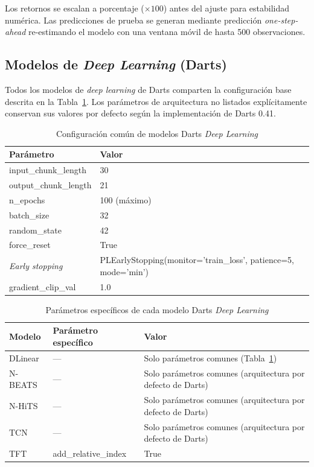 Los retornos se escalan a porcentaje ($\times 100$) antes del ajuste para estabilidad num\'erica. Las predicciones de prueba se generan mediante predicci\'on \textit{one-step-ahead} re-estimando el modelo con una ventana m\'ovil de hasta 500 observaciones.

\subsection{Modelos de \textit{Deep Learning} (Darts)}
\label{app:dl_hyperparams}

Todos los modelos de \textit{deep learning} de Darts comparten la configuraci\'on base descrita en la Tabla~\ref{tab:darts_dl_common}. Los par\'ametros de arquitectura no listados expl\'icitamente conservan sus valores por defecto seg\'un la implementaci\'on de Darts 0.41.

\begin{table}[H]
\centering
\caption{Configuraci\'on com\'un de modelos Darts \textit{Deep Learning}}
\label{tab:darts_dl_common}
\small
\begin{tabular}{@{}lp{10cm}@{}}
\toprule
\textbf{Par\'ametro} & \textbf{Valor} \\
\midrule
input\_chunk\_length & 30 \\
output\_chunk\_length & 21 \\
n\_epochs & 100 (m\'aximo) \\
batch\_size & 32 \\
random\_state & 42 \\
force\_reset & True \\
\textit{Early stopping} & PLEarlyStopping(monitor='train\_loss', patience=5, mode='min') \\
gradient\_clip\_val & 1.0 \\
\bottomrule
\end{tabular}
\end{table}

\begin{table}[H]
\centering
\caption{Par\'ametros espec\'ificos de cada modelo Darts \textit{Deep Learning}}
\label{tab:hyper_dl_specific}
\small
\begin{tabular}{@{}llp{8cm}@{}}
\toprule
\textbf{Modelo} & \textbf{Par\'ametro espec\'ifico} & \textbf{Valor} \\
\midrule
DLinear & --- & Solo par\'ametros comunes (Tabla~\ref{tab:darts_dl_common}) \\
\midrule
N-BEATS & --- & Solo par\'ametros comunes (arquitectura por defecto de Darts) \\
\midrule
N-HiTS & --- & Solo par\'ametros comunes (arquitectura por defecto de Darts) \\
\midrule
TCN & --- & Solo par\'ametros comunes (arquitectura por defecto de Darts) \\
\midrule
TFT & add\_relative\_index & True \\
\bottomrule
\end{tabular}
\end{table}

